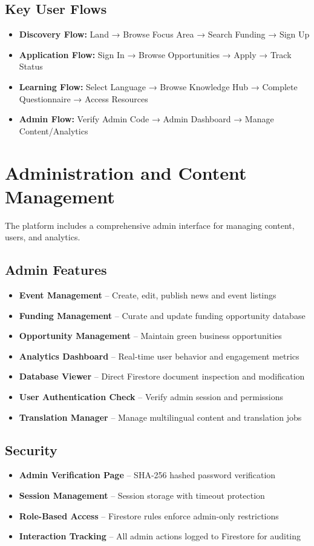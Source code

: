 \documentclass[a4paper,12pt]{article}
\begin{document}
\subsection{Key User Flows}
\begin{itemize}
    \item \textbf{Discovery Flow:} Land → Browse Focus Area → Search Funding → Sign Up
    \item \textbf{Application Flow:} Sign In → Browse Opportunities → Apply → Track Status
    \item \textbf{Learning Flow:} Select Language → Browse Knowledge Hub → Complete Questionnaire → Access Resources
    \item \textbf{Admin Flow:} Verify Admin Code → Admin Dashboard → Manage Content/Analytics
\end{itemize}

\section{Administration and Content Management}
The platform includes a comprehensive admin interface for managing content, users, and analytics.

\subsection{Admin Features}
\begin{itemize}
    \item \textbf{Event Management} – Create, edit, publish news and event listings
    \item \textbf{Funding Management} – Curate and update funding opportunity database
    \item \textbf{Opportunity Management} – Maintain green business opportunities
    \item \textbf{Analytics Dashboard} – Real-time user behavior and engagement metrics
    \item \textbf{Database Viewer} – Direct Firestore document inspection and modification
    \item \textbf{User Authentication Check} – Verify admin session and permissions
    \item \textbf{Translation Manager} – Manage multilingual content and translation jobs
\end{itemize}

\subsection{Security}
\begin{itemize}
    \item \textbf{Admin Verification Page} – SHA-256 hashed password verification
    \item \textbf{Session Management} – Session storage with timeout protection
    \item \textbf{Role-Based Access} – Firestore rules enforce admin-only restrictions
    \item \textbf{Interaction Tracking} – All admin actions logged to Firestore for auditing
\end{itemize}
\end{document}
